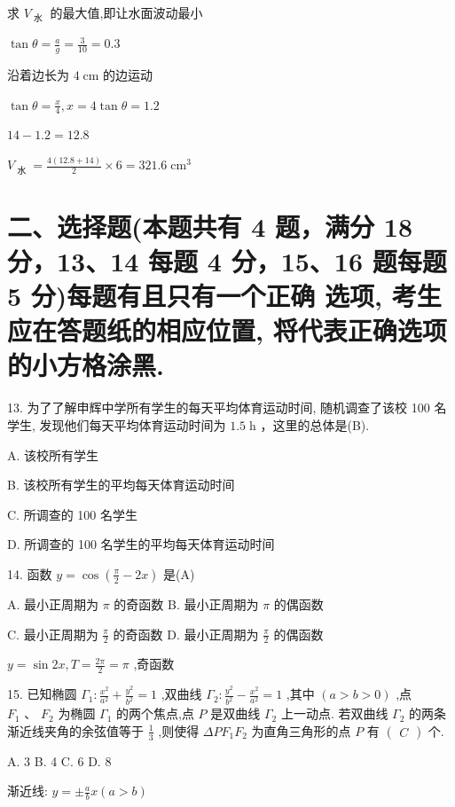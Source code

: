\documentclass[10pt]{article}
\begin{document}
求 \({V}_{\text{ 水 }}\) 的最大值,即让水面波动最小

\(\tan \theta  = \frac{a}{g} = \frac{3}{10} = {0.3}\)

沿着边长为 \(4\mathrm{\;{cm}}\) 的边运动

\(\tan \theta  = \frac{x}{4},x = 4\tan \theta  = {1.2}\)

\({14} - {1.2} = {12.8}\)

\({V}_{\text{ 水 }} = \frac{4\left( {{12.8} + {14}}\right) }{2} \times  6 = {321.6}{\mathrm{\;{cm}}}^{3}\)

\section*{二、选择题(本题共有 4 题，满分 18 分，13、14 每题 4 分，15、16 题每题 5 分)每题有且只有一个正确 选项, 考生应在答题纸的相应位置, 将代表正确选项的小方格涂黑.}

13. 为了了解申辉中学所有学生的每天平均体育运动时间, 随机调查了该校 100 名学生, 发现他们每天平均体育运动时间为 \({1.5}\mathrm{\;h}\) ，这里的总体是(B).

A. 该校所有学生

B. 该校所有学生的平均每天体育运动时间

C. 所调查的 100 名学生

D. 所调查的 100 名学生的平均每天体育运动时间

14. 函数 \(y = \cos \left( {\frac{\pi }{2} - {2x}}\right)\) 是(A)

A. 最小正周期为 \(\pi\) 的奇函数 B. 最小正周期为 \(\pi\) 的偶函数

C. 最小正周期为 \(\frac{\pi }{2}\) 的奇函数 D. 最小正周期为 \(\frac{\pi }{2}\) 的偶函数

\(y = \sin {2x},T = \frac{2\pi }{2} = \pi\) ,奇函数

15. 已知椭圆 \({\Gamma }_{1} : \frac{{x}^{2}}{{a}^{2}} + \frac{{y}^{2}}{{b}^{2}} = 1\) ,双曲线 \({\Gamma }_{2} : \frac{{y}^{2}}{{b}^{2}} - \frac{{x}^{2}}{{a}^{2}} = 1\) ,其中 \(\left( {a > b > 0}\right)\) ,点 \({F}_{1}\text{ 、 }{F}_{2}\) 为椭圆 \({\Gamma }_{1}\) 的两个焦点,点 \(P\) 是双曲线 \({\Gamma }_{2}\) 上一动点. 若双曲线 \({\Gamma }_{2}\) 的两条渐近线夹角的余弦值等于 \(\frac{1}{3}\) ,则使得 \({\Delta P}{F}_{1}{F}_{2}\) 为直角三角形的点 \(P\) 有 \(\left( \begin{array}{l} C \end{array}\right)\) 个.

A. 3 B. 4 C. 6 D. 8

渐近线: \(y =  \pm  \frac{a}{b}x\left( {a > b}\right)\)
\end{document}
